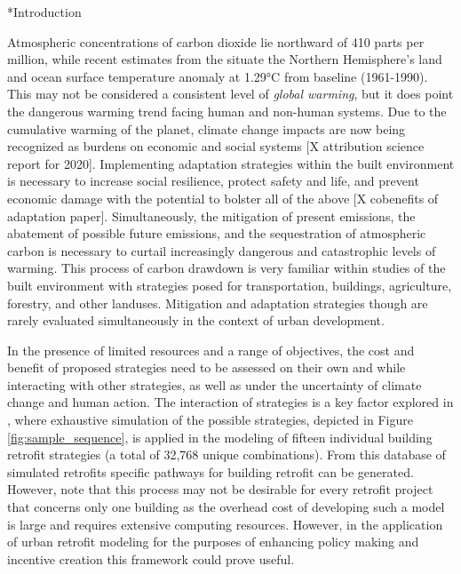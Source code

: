 \documentclass[twocolumn, a4paper,10pt]{article}
\makeatletter
\renewcommand\section{\@startsection{section}{1}{\z@}{3pt}{3pt}{\normalfont\large\bfseries}}
\makeatother
\begin{document}
\section*{Introduction}

Atmospheric concentrations of carbon dioxide lie northward of 410 parts per million, while recent estimates from the \citet{ncdc} situate the Northern Hemisphere’s land and ocean surface temperature anomaly at 1.29°C from baseline (1961-1990). This may not be considered a consistent level of \textit{global warming}, but it does point the dangerous warming trend facing human and non-human systems. Due to the cumulative warming of the planet, climate change impacts are now being recognized as burdens on economic and social systems [X attribution science report for 2020]. Implementing adaptation strategies within the built environment is necessary to increase social resilience, protect safety and life, and prevent economic damage with the potential to bolster all of the above [X cobenefits of adaptation paper]. Simultaneously, the mitigation of present emissions, the abatement of possible future emissions, and the sequestration of atmospheric carbon is necessary to curtail increasingly dangerous and catastrophic levels of warming. This process of carbon drawdown is very familiar within studies of the built environment with strategies posed for transportation, buildings, agriculture, forestry, and other landuses. Mitigation and adaptation strategies though are rarely evaluated simultaneously in the context of urban development.

In the presence of limited resources and a range of objectives, the cost and benefit of proposed strategies need to be assessed on their own and while interacting with other strategies, as well as under the uncertainty of climate change and human action. The interaction of strategies is a key factor explored in \citet{rysanek MACC}, where exhaustive simulation of the possible strategies, depicted in Figure \ref{fig:sample_sequence}, is applied in the modeling of fifteen individual building retrofit strategies (a total of 32,768 unique combinations). From this database of simulated retrofits specific pathways for building retrofit can be generated. However, \citet{rysanek MACC} note that this process may not be desirable for every retrofit project that concerns only one building as the overhead cost of developing such a model is large and requires extensive computing resources. However, in the application of urban retrofit modeling for the purposes of enhancing policy making and incentive creation this framework could prove useful.
\end{document}
